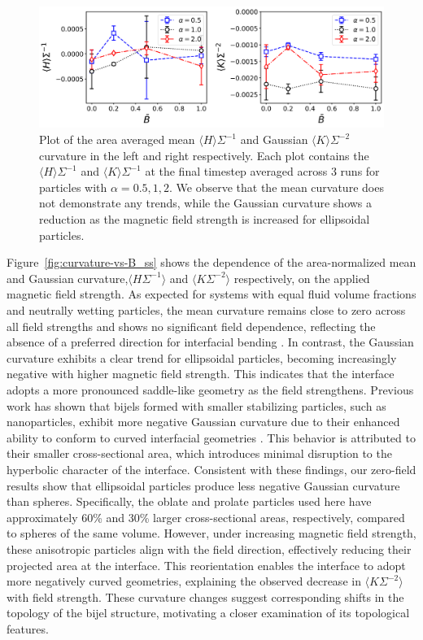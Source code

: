 \begin{figure}
\includegraphics[width=\textwidth]{../figures/results/paper1_5/curvature_field.png}%
\caption{Plot of the area averaged mean $\langle H \rangle \Sigma^{-1}$ and Gaussian $\langle K \rangle \Sigma^{-2}$ curvature in the left and right 
         respectively. Each plot contains the $\langle H \rangle \Sigma^{-1}$ and $\langle K \rangle \Sigma^{-1}$ at the final timestep averaged across 
         3 runs for particles with $\alpha = 0.5, 1, 2$. We observe that the mean curvature does not demonstrate any trends, while the Gaussian curvature 
         shows a reduction as the magnetic field strength is increased for ellipsoidal particles.}
\label{fig:curvature_field}%
\end{figure}

Figure~\ref{fig:curvature-vs-B_ss} shows the dependence of the area-normalized mean and Gaussian curvature,\(\langle H \Sigma^{-1} \rangle\) and \(\langle K \Sigma^{-2} \rangle\) respectively, on the 
applied magnetic field strength. As expected for systems with equal fluid volume fractions and neutrally wetting particles, the mean curvature remains close to zero across all field strengths and shows 
no significant field dependence, reflecting the absence of a preferred direction for interfacial bending \cite{jinnai_interfacial_2001}. In contrast, the Gaussian curvature exhibits a clear trend for 
ellipsoidal particles, becoming increasingly negative with higher magnetic field strength. This indicates that the interface adopts a more pronounced saddle-like geometry as the field strengthens.
Previous work has shown that bijels formed with smaller stabilizing particles, such as nanoparticles, exhibit more negative Gaussian curvature due to their enhanced ability to conform to curved interfacial 
geometries \cite{reeves_quantitative_2016}. This behavior is attributed to their smaller cross-sectional area, which introduces minimal disruption to the hyperbolic character of the interface. Consistent 
with these findings, our zero-field results show that ellipsoidal particles produce less negative Gaussian curvature than spheres. Specifically, the oblate and prolate particles used here have approximately 
60\% and 30\% larger cross-sectional areas, respectively, compared to spheres of the same volume. However, under increasing magnetic field strength, these anisotropic particles align with the field direction, 
effectively reducing their projected area at the interface. This reorientation enables the interface to adopt more negatively curved geometries, explaining the observed decrease in 
\(\langle K \Sigma^{-2} \rangle\) with field strength. These curvature changes suggest corresponding shifts in the topology of the bijel structure, motivating a closer examination of its topological features.


